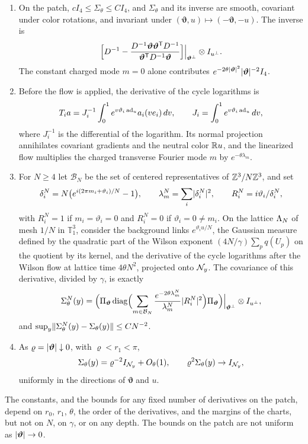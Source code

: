 \begin{theorem}
\begin{enumerate}
\item On the patch, $cI_4\le\Sigma_\theta\le CI_4$, and $\Sigma_\theta$ and its inverse are smooth, covariant under color rotations, and invariant under $(\bm\vartheta,u)\mapsto(-\bm\vartheta,-u)$. The inverse is
\[
 \Bigl[D^{-1}-\frac{D^{-1}\bm\vartheta\bm\vartheta^{\mathsf T}D^{-1}}{\bm\vartheta^{\mathsf T}D^{-1}\bm\vartheta}\Bigr]\Big|_{\bm\vartheta^\perp}\otimes I_{u^\perp}.
\]
The constant charged mode $m=0$ alone contributes $e^{-2\theta\lvert \bm\vartheta\rvert^2}\lvert \bm\vartheta\rvert^{-2}I_4$.
\item Before the flow is applied, the derivative of the cycle logarithms is
\[
 T_ia=J_i^{-1}\int_0^1e^{v\vartheta_i\operatorname{ad}_u}a_i(ve_i)\,dv,\qquad J_i=\int_0^1e^{v\vartheta_i\operatorname{ad}_u}\,dv,
\]
where $J_i^{-1}$ is the differential of the logarithm. Its normal projection annihilates covariant gradients and the neutral color $\mathbb R u$, and the linearized flow multiplies the charged transverse Fourier mode $m$ by $e^{-\theta\lambda_m}$.
\item For $N\ge4$ let $\mathcal B_N$ be the set of centered representatives of $\mathbb Z^3/N\mathbb Z^3$, and set
\[
 \delta_i^N=N\bigl(e^{i(2\pi m_i+\vartheta_i)/N}-1\bigr),\qquad\lambda_m^N=\sum_i\lvert \delta_i^N\rvert^2,\qquad R_i^N=i\vartheta_i/\delta_i^N,
\]
with $R_i^N=1$ if $m_i=\vartheta_i=0$ and $R_i^N=0$ if $\vartheta_i=0\ne m_i$. On the lattice $\Lambda_{N}$ of mesh $1/N$ in $\mathbb T_1^3$, consider the background links $e^{\vartheta_iu/N}$, the Gaussian measure defined by the quadratic part of the Wilson exponent $(4N/\gamma)\sum_pq(U_p)$ on the quotient by its kernel, and the derivative of the cycle logarithms after the Wilson flow at lattice time $4\theta N^2$, projected onto $\mathcal N_{y}$. The covariance of this derivative, divided by $\gamma$, is exactly
\[
 \Sigma_\theta^N(y)=\Bigl(\Pi_{\bm\vartheta}\operatorname{diag}\Bigl(\sum_{m\in\mathcal B_N}\frac{e^{-2\theta\lambda_m^N}}{\lambda_m^N}\lvert R_i^N\rvert^2\Bigr)\Pi_{\bm\vartheta}\Bigr)\Big|_{\bm\vartheta^\perp}\otimes I_{u^\perp},
\]
and $\sup_y\lVert \Sigma_\theta^N(y)-\Sigma_\theta(y)\rVert\le CN^{-2}$.
\item As $\varrho=\lvert \bm\vartheta\rvert\downarrow0$, with $\varrho<r_1<\pi$,
\[
 \Sigma_\theta(y)=\varrho^{-2}I_{\mathcal N_{y}}+O_\theta(1),\qquad\varrho^2\Sigma_\theta(y)\to I_{\mathcal N_{y}},
\]
uniformly in the directions of $\bm\vartheta$ and $u$.
\end{enumerate}
The constants, and the bounds for any fixed number of derivatives on the patch, depend on $r_0$, $r_1$, $\theta$, the order of the derivatives, and the margins of the charts, but not on $N$, on $\gamma$, or on any depth. The bounds on the patch are not uniform as $\lvert \bm\vartheta\rvert\to0$.
\end{theorem}

